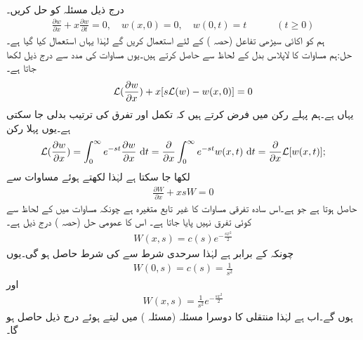 \quad {}\\
درج ذیل مسئلہ کو حل کریں۔
\begin{align}\label{مساوات_جزوی_لاپلاس_پہلی_مثال_الف}
\frac{\partial w}{\partial x}+x\frac{\partial w}{\partial t}=0,\quad w(x,0)=0,\quad w(0,t)=t\quad \quad \quad (t\ge 0)
\end{align}
 ہم  کو اکائی سیڑھی تفاعل (حصہ ) کے لئے استعمال کریں گے لہٰذا یہاں  استعمال کیا گیا ہے۔ \\
حل:\quad ہم مساوات  کا لاپلاس بدل  کے لحاظ سے حاصل کرتے ہیں۔یوں مساوات  کی مدد سے درج ذیل لکھا جاتا ہے۔
\begin{align}\label{مساوات_جزوی_لاپلاس_پہلی_مثال_ب}
\mathcal{L}(\frac{\partial w}{\partial x})+x[s\mathcal{L}(w)-w(x,0)]=0
\end{align}
یہاں  ہے۔ہم پہلے رکن میں فرض کرتے ہیں کہ تکمل اور تفرق کی ترتیب بدلی جا سکتی ہے۔یوں پہلا رکن 
\begin{align}\label{مساوات_جزوی_لاپلاس_پہلی_مثال_پ}
\Laplace(\frac{\partial w}{\partial x})=\int_0^{\infty} e^{-st}\frac{\partial w}{\partial x}\,\dif t=\frac{\partial}{\partial x}\int_0^{\infty} e^{-st} w(x,t)\,\dif t=\frac{\partial}{\partial x}\Laplace[w(x,t)];
\end{align} 
لکھا جا سکتا ہے لہٰذا  لکھتے ہوئے  مساوات  سے
\begin{align*}
\frac{\partial W}{\partial x}+xsW=0
\end{align*}
حاصل ہوتا ہے  جو  ہے۔اس سادہ تفرقی مساوات کا غیر تابع متغیرہ  ہے چونکہ مساوات میں  کے لحاظ سے کوئی تفرق نہیں پایا جاتا ہے۔ اس کا عمومی حل (حصہ ) درج ذیل ہے۔
\begin{align*}
W(x,s)=c(s)e^{-\frac{sx^2}{2}}
\end{align*}
چونکہ  کے برابر ہے لہٰذا سرحدی شرط  سے  کی شرط حاصل ہو گی۔یوں
\begin{align*}
W(0,s)=c(s)=\frac{1}{s^2}
\end{align*}
اور
\begin{align*}
W(x,s)=\frac{1}{s^2}e^{-\frac{sx^2}{2}}
\end{align*}
ہوں گے۔اب  ہے لہٰذا  منتقلی کا دوسرا مسئلہ (مسئلہ ) میں  لیتے ہوئے درج ذیل حاصل ہو گا۔
